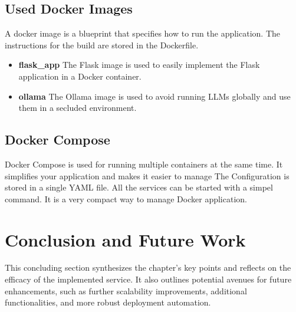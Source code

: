 \subsection{Used Docker Images}
A docker image is a blueprint that specifies how to run the application. The instructions for the build are stored in the Dockerfile.
\cite{dockerize_flask} 

\begin{itemize}
    \item \textbf{flask\_app} The Flask image is used to easily implement the Flask application in a Docker container.
    \item \textbf{ollama} The Ollama image is used to avoid running LLMs globally and use them in a secluded environment.
\end{itemize}

\subsection{Docker Compose}
Docker Compose is used for running multiple containers at the same time. It simplifies your application and makes it easier to manage 
The Configuration is stored in a single YAML file. All the services can be started with a simpel command. It is a very compact way to manage Docker application.
\cite{docker_compose} 


\section{Conclusion and Future Work}
This concluding section synthesizes the chapter’s key points and reflects on the efficacy of the implemented service. It also outlines potential avenues for future enhancements, such as further scalability improvements, additional functionalities, and more robust deployment automation.





